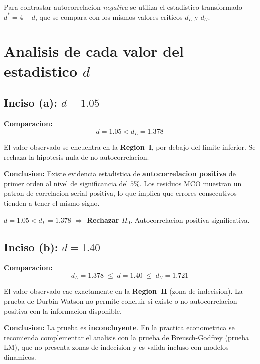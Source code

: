 \documentclass[12pt, letterpaper]{article}
\begin{document}
\medskip
\noindent Para contrastar autocorrelacion \emph{negativa} se utiliza el estadistico
transformado $d^* = 4 - d$, que se compara con los mismos valores criticos $d_L$
y $d_U$.

\section{Analisis de cada valor del estadistico $d$}

\subsection{Inciso (a): $d = 1.05$}

\textbf{Comparacion:}
\begin{equation}
  d = 1.05 < d_L = 1.378
\end{equation}

El valor observado se encuentra en la \textbf{Region~I}, por debajo del limite
inferior. Se rechaza la hipotesis nula de no autocorrelacion.

\textbf{Conclusion:} Existe evidencia estadistica de \textbf{autocorrelacion
positiva} de primer orden al nivel de significancia del $5\%$. Los residuos MCO
muestran un patron de correlacion serial positiva, lo que implica que errores
consecutivos tienden a tener el mismo signo.

\begin{clave}
  $d = 1.05 < d_L = 1.378$ $\Rightarrow$ \textbf{Rechazar $H_0$}.
  Autocorrelacion positiva significativa.
\end{clave}

\subsection{Inciso (b): $d = 1.40$}

\textbf{Comparacion:}
\begin{equation}
  d_L = 1.378 \;\le\; d = 1.40 \;\le\; d_U = 1.721
\end{equation}

El valor observado cae exactamente en la \textbf{Region~II} (zona de indecision).
La prueba de Durbin-Watson no permite concluir si existe o no autocorrelacion
positiva con la informacion disponible.

\textbf{Conclusion:} La prueba es \textbf{inconcluyente}. En la practica
econometrica se recomienda complementar el analisis con la prueba de
Breusch-Godfrey (prueba LM), que no presenta zonas de indecision y es valida
incluso con modelos dinamicos.
\end{document}
